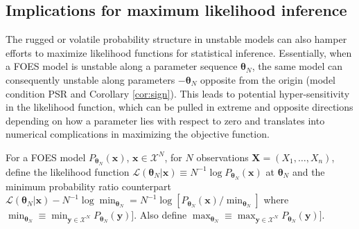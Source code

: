 \documentclass[12pt]{article}
\theoremstyle{definition}
\begin{document}
\subsection{Implications for maximum likelihood
inference}\label{implications-for-maximum-likelihood-inference}

The rugged or volatile probability structure in unstable models can also
hamper efforts to maximize likelihood functions for statistical
inference. Essentially, when a FOES model is unstable along a parameter
sequence \(\boldsymbol \theta_N\), the same model can consequently
unstable along parameters \(-\boldsymbol \theta_N\) opposite from the
origin (model condition PSR and Corollary \ref{cor:sign}). This leads to
potential hyper-sensitivity in the likelihood function, which can be
pulled in extreme and opposite directions depending on how a parameter
lies with respect to zero and translates into numerical complications in
maximizing the objective function.

For a FOES model \(P_{\boldsymbol \theta_N}(\boldsymbol x)\),
\(\boldsymbol x\in\mathcal{X}^N\), for \(N\) observations
\(\boldsymbol X =(X_1,\ldots,X_n)\), define the likelihood function
\(\mathcal{L}(\boldsymbol \theta_N | \boldsymbol x) \equiv N^{-1}\log P_{\boldsymbol \theta_N }(\boldsymbol x)\)
at \(\boldsymbol \theta_N\) and the minimum probability ratio
counterpart
\(\mathcal{L}(\boldsymbol \theta_N | \boldsymbol x) - N^{-1} \log \min_{\boldsymbol \theta_N}= N^{-1}\log[P_{\boldsymbol \theta_N }(\boldsymbol x) /\min_{\boldsymbol \theta_N}]\)
where
\(\min_{\boldsymbol \theta_N} \equiv \min_{\boldsymbol y\in\mathcal{X}^N} P_{\boldsymbol \theta_N }(\boldsymbol y)]\).
Also define
\(\max_{\boldsymbol \theta_N} \equiv \max_{\boldsymbol y\in\mathcal{X}^N} P_{\boldsymbol \theta_N }(\boldsymbol y)]\).
\end{document}
